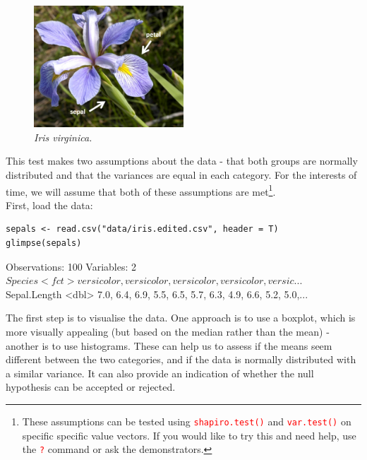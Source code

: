 \documentclass[a4paper,12pt]{article}
\newcommand\code[1]{\textcolor{red}{\texttt{#1}}}
\begin{document}
\begin{figure}[h]
\centering 
\includegraphics[width=0.5\textwidth]{figs/Irisvirginica.jpg}
\caption{\textit{Iris virginica.}}
\label{fig:IrisVirginica}
\end{figure} 

This test makes two assumptions about the data - that both groups are normally distributed and that the variances are equal in each category. For the interests of time, we will assume that both of these assumptions are met\footnote{These assumptions can be tested using \code{shapiro.test()} and \code{var.test()} on specific specific value vectors. If you would like to try this and need help, use the \code{?} command or ask the demonstrators.}.\\

First, load the data:

\begin{shaded}
\begin{verbatim}
sepals <- read.csv("data/iris.edited.csv", header = T)
glimpse(sepals)
\end{verbatim}


\begin{Schunk}
\begin{Soutput}
Observations: 100
Variables: 2
$ Species      <fct> versicolor, versicolor, versicolor, versicolor, versic...
$ Sepal.Length <dbl> 7.0, 6.4, 6.9, 5.5, 6.5, 5.7, 6.3, 4.9, 6.6, 5.2, 5.0,...
\end{Soutput}
\end{Schunk}
\end{shaded}


The first step is to visualise the data. One approach is to use a boxplot, which is more visually appealing (but based on the median rather than the mean) - another is to use histograms. These can help us to assess if the means seem different between the two categories, and if the data is normally distributed with a similar variance. It can also provide an indication of whether the null hypothesis can be accepted or rejected.
\end{document}
